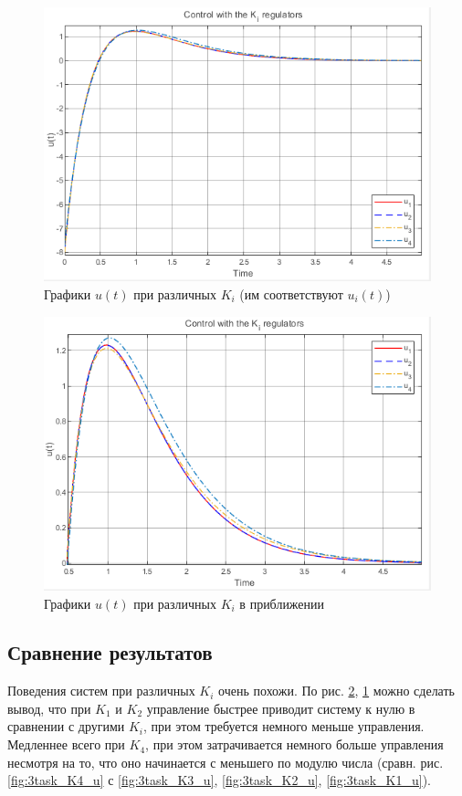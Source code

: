 \documentclass[a4paper, 12pt]{article}
\begin{document}
    \begin{figure}[H]
        \centering
        \includegraphics{3task_Ki_u.png}
        \captionsetup{skip=0pt}
        \caption{Графики $u(t)$ при различных $K_i$ (им соответствуют $u_i(t)$)}
        \label{fig:3task_Ki_u}
    \end{figure}
    \begin{figure}[H]
        \centering
        \includegraphics{3task_Ki_u_close.png}
        \captionsetup{skip=0pt}
        \caption{Графики $u(t)$ при различных $K_i$ в приближении}
        \label{fig:3task_Ki_u_close}
    \end{figure}


    \subsection{Сравнение результатов}
    Поведения систем при различных $K_i$ очень похожи. По рис. \ref{fig:3task_Ki_u_close}, \ref{fig:3task_Ki_u}
    можно сделать вывод, что при $K_1$ и $K_2$ управление быстрее приводит систему к нулю
    в сравнении с другими $K_i$, при этом требуется немного меньше управления. Медленнее всего при $K_4$,
    при этом затрачивается немного больше управления несмотря на то, что оно начинается с меньшего по модулю числа
    (сравн. рис. \ref{fig:3task_K4_u} с \ref{fig:3task_K3_u}, \ref{fig:3task_K2_u}, \ref{fig:3task_K1_u}).
\end{document}
